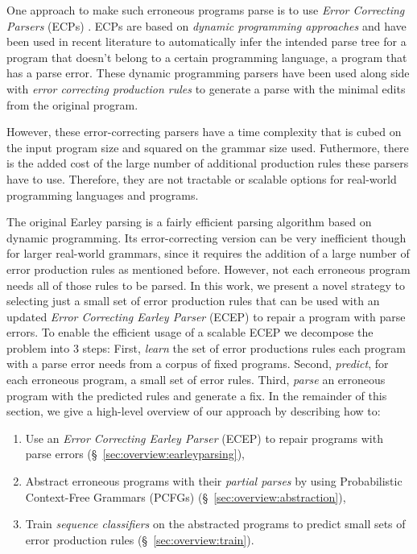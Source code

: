 One approach to make such erroneous programs parse is to use \emph{Error
Correcting Parsers} (ECPs) \citep{?}. ECPs are based on \emph{dynamic
programming approaches} and have been used in recent literature to automatically
infer the intended parse tree for a program that doesn't belong to a certain
programming language, \ie a program that has a parse error. These dynamic
programming parsers have been used along side with \emph{error correcting
production rules} \citep{?} to generate a parse with the minimal edits from the
original program.

 However, these error-correcting parsers have a time
complexity that is cubed on the input program size and squared on the grammar
size used. Futhermore, there is the added cost of the large number of additional
production rules these parsers have to use. Therefore, they are not tractable or
scalable options for real-world programming languages and programs.


 The original Earley
parsing is a fairly efficient parsing algorithm \citep{?} based on dynamic
programming. Its error-correcting version can be very inefficient though for
larger real-world grammars, since it requires the addition of a large number of
error production rules as mentioned before. However, not each erroneous program
needs all of those rules to be parsed. In this work, we present a novel strategy
to selecting just a small set of error production rules that can be used with an
updated \emph{Error Correcting Earley Parser} (ECEP) to repair a program with
parse errors.
%
To enable the efficient usage of a scalable ECEP we decompose the problem into 3
steps:
%
First, \emph{learn} the set of error productions rules each program with a parse
error needs from a corpus of fixed programs.
%
Second, \emph{predict}, for each erroneous program, a small set of error rules.
%
Third, \emph{parse} an erroneous program with the predicted rules and generate a
fix.
%
In the remainder of this section, we give a high-level overview
of our approach by describing how to:

\begin{enumerate}

  \item Use an \emph{Error Correcting Earley Parser} (ECEP) to repair programs
  with parse errors (\S~\ref{sec:overview:earleyparsing}),

  \item Abstract erroneous programs with their \emph{partial parses} by using
  Probabilistic Context-Free Grammars (PCFGs)
  (\S~\ref{sec:overview:abstraction}),

  \item Train \emph{sequence classifiers} on the abstracted programs to predict
  small sets of error production rules (\S~\ref{sec:overview:train}).

\end{enumerate}

